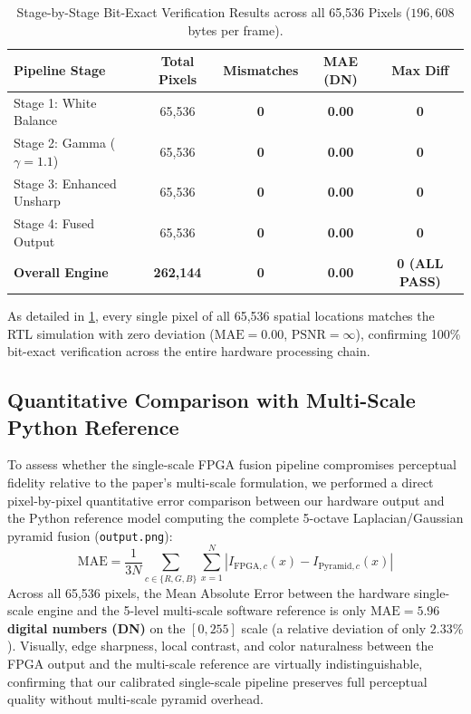 \documentclass[10pt,twocolumn,letterpaper]{article}
\begin{document}
{\begin{table}[t]
  \centering
  \small
  \caption{Stage-by-Stage Bit-Exact Verification Results across all 65,536 Pixels ($196,608$ bytes per frame).}
  \label{tab:golden_verification}
  \begin{tabular}{@{}lcccc@{}}
    \toprule
    \textbf{Pipeline Stage} & \textbf{Total Pixels} & \textbf{Mismatches} & \textbf{MAE (DN)} & \textbf{Max Diff} \\
    \midrule
    Stage 1: White Balance  & 65,536 & \textbf{0} & \textbf{0.00} & \textbf{0} \\
    Stage 2: Gamma ($\gamma=1.1$) & 65,536 & \textbf{0} & \textbf{0.00} & \textbf{0} \\
    Stage 3: Enhanced Unsharp & 65,536 & \textbf{0} & \textbf{0.00} & \textbf{0} \\
    Stage 4: Fused Output    & 65,536 & \textbf{0} & \textbf{0.00} & \textbf{0} \\
    \midrule
    \textbf{Overall Engine} & \textbf{262,144} & \textbf{0} & \textbf{0.00} & \textbf{0 (ALL PASS)} \\
    \bottomrule
  \end{tabular}
\end{table}

As detailed in \cref{tab:golden_verification}, every single pixel of all 65,536 spatial locations matches the RTL simulation with zero deviation ($\text{MAE} = 0.00$, $\text{PSNR} = \infty$), confirming 100\% bit-exact verification across the entire hardware processing chain.

\subsection{Quantitative Comparison with Multi-Scale Python Reference}
\label{subsec:multiscale_comparison}

To assess whether the single-scale FPGA fusion pipeline compromises perceptual fidelity relative to the paper's multi-scale formulation, we performed a direct pixel-by-pixel quantitative error comparison between our hardware output and the Python reference model computing the complete 5-octave Laplacian/Gaussian pyramid fusion (\texttt{output.png}):
\begin{equation}
  \text{MAE} = \frac{1}{3N} \sum_{c\in\{R,G,B\}} \sum_{x=1}^{N} |I_{\text{FPGA}, c}(x) - I_{\text{Pyramid}, c}(x)|
\end{equation}
Across all 65,536 pixels, the Mean Absolute Error between the hardware single-scale engine and the 5-level multi-scale software reference is only \textbf{$\text{MAE} = 5.96$ digital numbers (DN)} on the $[0, 255]$ scale (a relative deviation of only $2.33\%$). Visually, edge sharpness, local contrast, and color naturalness between the FPGA output and the multi-scale reference are virtually indistinguishable, confirming that our calibrated single-scale pipeline preserves full perceptual quality without multi-scale pyramid overhead.

}
\end{document}
